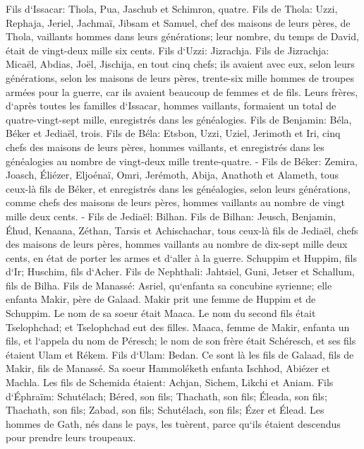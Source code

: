 \verse Fils d`Issacar: Thola, Pua, Jaschub et Schimron, quatre. 
\verse Fils de Thola: Uzzi, Rephaja, Jeriel, Jachmaï, Jibsam et Samuel, chef des maisons de leurs pères, de Thola, vaillants hommes dans leurs générations; leur nombre, du temps de David, était de vingt-deux mille six cents. 
\verse Fils d`Uzzi: Jizrachja. Fils de Jizrachja: Micaël, Abdias, Joël, Jischija, en tout cinq chefs; 
\verse ils avaient avec eux, selon leurs générations, selon les maisons de leurs pères, trente-six mille hommes de troupes armées pour la guerre, car ils avaient beaucoup de femmes et de fils. 
\verse Leurs frères, d`après toutes les familles d`Issacar, hommes vaillants, formaient un total de quatre-vingt-sept mille, enregistrés dans les généalogies. 
\verse Fils de Benjamin: Béla, Béker et Jediaël, trois. 
\verse Fils de Béla: Etsbon, Uzzi, Uziel, Jerimoth et Iri, cinq chefs des maisons de leurs pères, hommes vaillants, et enregistrés dans les généalogies au nombre de vingt-deux mille trente-quatre. - 
\verse Fils de Béker: Zemira, Joasch, Éliézer, Eljoénaï, Omri, Jerémoth, Abija, Anathoth et Alameth, tous ceux-là fils de Béker, 
\verse et enregistrés dans les généalogies, selon leurs générations, comme chefs des maisons de leurs pères, hommes vaillants au nombre de vingt mille deux cents. - 
\verse Fils de Jediaël: Bilhan. Fils de Bilhan: Jeusch, Benjamin, Éhud, Kenaana, Zéthan, Tarsis et Achischachar, 
\verse tous ceux-là fils de Jediaël, chefs des maisons de leurs pères, hommes vaillants au nombre de dix-sept mille deux cents, en état de porter les armes et d`aller à la guerre. 
\verse Schuppim et Huppim, fils d`Ir; Huschim, fils d`Acher. 
\verse Fils de Nephthali: Jahtsiel, Guni, Jetser et Schallum, fils de Bilha. 
\verse Fils de Manassé: Asriel, qu`enfanta sa concubine syrienne; elle enfanta Makir, père de Galaad. 
\verse Makir prit une femme de Huppim et de Schuppim. Le nom de sa soeur était Maaca. Le nom du second fils était Tselophchad; et Tselophchad eut des filles. 
\verse Maaca, femme de Makir, enfanta un fils, et l`appela du nom de Péresch; le nom de son frère était Schéresch, et ses fils étaient Ulam et Rékem. 
\verse Fils d`Ulam: Bedan. Ce sont là les fils de Galaad, fils de Makir, fils de Manassé. 
\verse Sa soeur Hammoléketh enfanta Ischhod, Abiézer et Machla. 
\verse Les fils de Schemida étaient: Achjan, Sichem, Likchi et Aniam. 
\verse Fils d`Éphraïm: Schutélach; Béred, son fils; Thachath, son fils; Éleada, son fils; Thachath, son fils; 
\verse Zabad, son fils; Schutélach, son fils; Ézer et Élead. Les hommes de Gath, nés dans le pays, les tuèrent, parce qu`ils étaient descendus pour prendre leurs troupeaux. 
